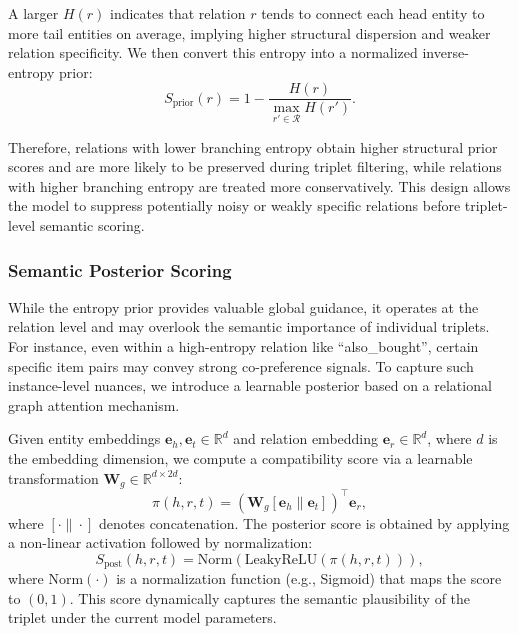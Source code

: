 A larger \(H(r)\) indicates that relation \(r\) tends to connect each head entity to more tail entities on average, implying higher structural dispersion and weaker relation specificity. We then convert this entropy into a normalized inverse-entropy prior:
\begin{equation}
\label{eq:relation_entropy_prior}
S_{\mathrm{prior}}(r)
=
1-\frac{H(r)}{\max_{r'\in\mathcal{R}}H(r')}.
\end{equation}

Therefore, relations with lower branching entropy obtain higher structural prior scores and are more likely to be preserved during triplet filtering, while relations with higher branching entropy are treated more conservatively. This design allows the model to suppress potentially noisy or weakly specific relations before triplet-level semantic scoring.

\subsubsection{\textbf{Semantic Posterior Scoring}}


While the entropy prior provides valuable global guidance, it operates at the relation level and may overlook the semantic importance of individual triplets. For instance, even within a high-entropy relation like ``also\_bought'', certain specific item pairs may convey strong co-preference signals. To capture such instance-level nuances, we introduce a learnable posterior based on a relational graph attention mechanism.


Given entity embeddings $\mathbf{e}_h, \mathbf{e}_t \in \mathbb{R}^d$ and relation embedding $\mathbf{e}_r \in \mathbb{R}^d$, where $d$ is the embedding dimension, we compute a compatibility score via a learnable transformation $\mathbf{W}_g \in \mathbb{R}^{d \times 2d}$:
\begin{equation}
	\label{eq:triplet_score}
	\pi(h, r, t) = \left( \mathbf{W}_g [\mathbf{e}_h \| \mathbf{e}_t] \right)^\top \mathbf{e}_r,
\end{equation}
where $[\cdot \| \cdot]$ denotes concatenation. The posterior score is obtained by applying a non-linear activation followed by normalization:
\begin{equation}
	S_{\text{post}}(h, r, t) = \text{Norm} \left( \text{LeakyReLU}(\pi(h, r, t)) \right),
\end{equation}
where $\text{Norm}(\cdot)$ is a normalization function (e.g., Sigmoid) that maps the score to $(0,1)$. This score dynamically captures the semantic plausibility of the triplet under the current model parameters.

